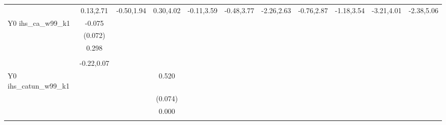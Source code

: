 \begin{table}[!h]
\begin{adjustbox}{width=\columnwidth,center}
\begin{tabular}{l*{8}{c}}
                    &   0.13,2.71         &  -0.50,1.94         &   0.30,4.02         &  -0.11,3.59         &  -0.48,3.77         &  -2.26,2.63         &  -0.76,2.87         &  -1.18,3.54         &  -3.21,4.01         &  -2.38,5.06         \\
Y0 ihs\_ca\_w99\_k1    &      -0.075         &                     &                     &                     &                     &                     &                     &                     &                     &                     \\
                    &     (0.072)         &                     &                     &                     &                     &                     &                     &                     &                     &                     \\
                    &       0.298         &                     &                     &                     &                     &                     &                     &                     &                     &                     \\
                    &                     &                     &                     &                     &                     &                     &                     &                     &                     &                     \\
                    &  -0.22,0.07         &                     &                     &                     &                     &                     &                     &                     &                     &                     \\
Y0 ihs\_catun\_w99\_k1 &                     &                     &       0.520\sym{***}&                     &                     &                     &                     &                     &                     &                     \\
                    &                     &                     &     (0.074)         &                     &                     &                     &                     &                     &                     &                     \\
                    &                     &                     &       0.000         &                     &                     &                     &                     &                     &                     &                     \\
                    &                     &                     &                     &                     &                     &                     &                     &                     &                     &                     \\

\end{tabular}
\end{adjustbox}
\end{table}

